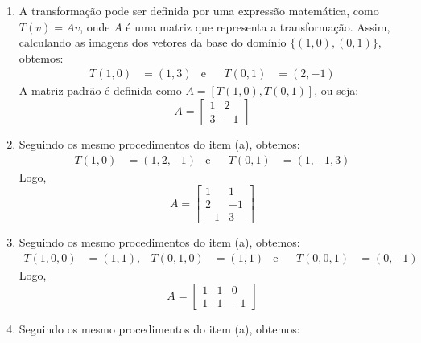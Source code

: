 \begin{resolution}
  \vspace{-24pt}
  \begin{enumerate}[label=\alph*)]
    \item  A transformação pode ser definida por uma expressão matemática, como \( T(v) = Av \), onde \( A \) é uma matriz que representa a transformação. Assim, calculando as imagens dos vetores da base do domínio $\{(1,0), (0,1)\}$, obtemos:
          \begin{align}
            T(1,0) & = (1, 3) & \text{e} &  & T(0, 1) & = (2, -1)
          \end{align}
          A matriz padrão é definida como $A = [T(1,0), T(0,1)]$, ou seja:
          \begin{equation}
            A = \begin{bmatrix}
              1 & 2  \\
              3 & -1
            \end{bmatrix}
          \end{equation}
    \item Seguindo os mesmo procedimentos do item (a), obtemos:
          \begin{align}
            T(1,0) & = (1, 2, -1) & \text{e} &  &
            T(0,1) & = (1, -1, 3)
          \end{align}
          Logo,
          \begin{equation}
            A = \begin{bmatrix}
              1 & 1 \\ 2 & -1 \\ -1 & 3
            \end{bmatrix}
          \end{equation}
    \item Seguindo os mesmo procedimentos do item (a), obtemos:
          \begin{align}
            T(1,0,0) & = (1, 1), &
            T(0,1,0) & = (1, 1)  & \text{e} &  &
            T(0,0,1) & = (0, -1)
          \end{align}
          Logo,
          \begin{equation}
            A = \begin{bmatrix}
              1 & 1 & 0 \\ 1 & 1 & -1
            \end{bmatrix}
          \end{equation}
    \item Seguindo os mesmo procedimentos do item (a), obtemos:

\end{enumerate}
\end{resolution}
